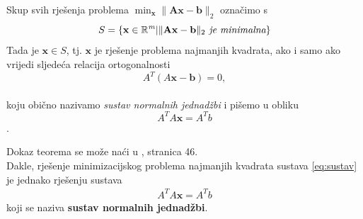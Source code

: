 \documentclass[a4paper,twoside,12pt]{memoir} %
\begin{document}
\begin{thm}
	Skup svih rješenja problema $\min_\mathbf{x}\| \mathbf{A}\mathbf{x} - \mathbf{b} \|_2$ označimo s
	$$ S= \{\mathbf{x} \in \mathbb{R}^\mathit{m} | \| \mathbf{A}\mathbf{x} - \mathbf{b} \|_2 \textit{ je minimalna} \} $$
	Tada je $\mathbf{x}  \in S$, tj. $\mathbf{x}$ je rješenje problema najmanjih kvadrata, ako i samo ako vrijedi sljedeća relacija ortogonalnosti 
	$$A^T(A\mathbf{x}-\mathbf{b}) = 0,$$
	\\ koju obično nazivamo \textit{sustav normalnih jednadžbi} i pišemo u obliku 
	$$ A^TA\mathbf{x} = A^Tb $$.
\end{thm}
Dokaz teorema se može naći u \cite{singer07}, stranica 46.\\
Dakle, rješenje minimizacijskog problema najmanjih kvadrata sustava \ref{eq:sustav} je jednako rješenju sustava 
\begin{align}\label{eq:sustavProj}
	A^TA\mathbf{x} = A^Tb 
\end{align}
koji se naziva \textbf{sustav normalnih jednadžbi}.
\end{document}
